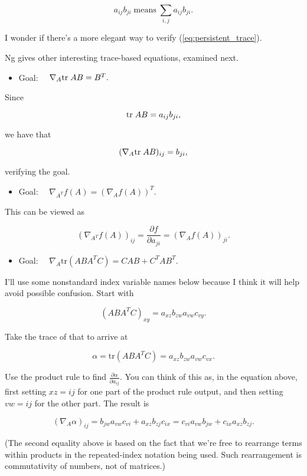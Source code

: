 \documentclass[]{article}
\providecommand{\tightlist}{%
  \setlength{\itemsep}{0pt}\setlength{\parskip}{0pt}}
\begin{document}
\[a_{ij}b_{ji} \;\text{means}\; \sum_{i,j} a_{ij}b_{ji}.\]

I wonder if there's a more elegant way to verify
(\ref{eq:persistent_trace}).

Ng gives other interesting trace-based equations, examined next.

\begin{itemize}
\tightlist
\item
  Goal: \(\quad \nabla_A\text{tr}\; AB = B^T.\)
\end{itemize}

Since

\[\text{tr}\; AB = a_{ij}b_{ji},\]

we have that

\[(\nabla_A\text{tr}\; AB)_{ij} = b_{ji},\]

verifying the goal.

\begin{itemize}
\tightlist
\item
  Goal: \(\quad \nabla_{A^T}f(A) = (\nabla_A f(A))^T.\)
\end{itemize}

This can be viewed as

\[(\nabla_{A^T}f(A))_{ij} = \frac{\partial f}{\partial a_{ji}}
                          = (\nabla_A f(A))_{ji}.\]

\begin{itemize}
\tightlist
\item
  Goal: \(\quad \nabla_A\text{tr}(ABA^TC) = CAB + C^TAB^T.\)
\end{itemize}

I'll use some nonstandard index variable names below because I think it
will help avoid possible confusion. Start with

\[(ABA^TC)_{xy} = a_{xz} b_{zw} a_{vw} c_{vy}.\]

Take the trace of that to arrive at

\[\alpha = \text{tr}(ABA^TC) = a_{xz} b_{zw} a_{vw} c_{vx}.\]

Use the product rule to find \(\frac{\partial\alpha}{\partial a_{ij}}\).
You can think of this as, in the equation above, first setting
\(xz = ij\) for one part of the product rule output, and then setting
\(vw = ij\) for the other part. The result is

\[(\nabla_A\alpha)_{ij} = b_{jw} a_{vw} c_{vi} + a_{xz} b_{zj} c_{ix}
                        = c_{vi} a_{vw} b_{jw} + c_{ix} a_{xz} b_{zj}.\]

(The second equality above is based on the fact that we're free to
rearrange terms within products in the repeated-index notation being
used. Such rearrangement is commutativity of numbers, not of matrices.)
\end{document}
